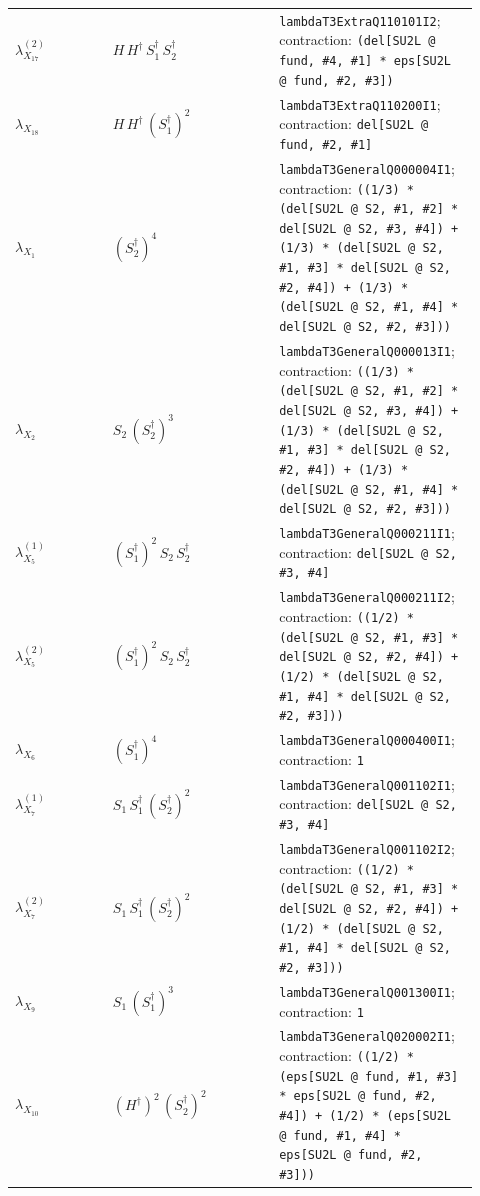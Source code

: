 \documentclass[9pt]{article}
\begin{document}
\begin{longtable}{@{}p{0.20\linewidth}p{0.34\linewidth}p{0.38\linewidth}@{}}
$\lambda_{X_{17}}^{(2)}$ & $H\,H^\dagger\,S_1^\dagger\,S_2^\dagger$ & \texttt{lambdaT3ExtraQ110101I2}; contraction: \texttt{(del[SU2L @ fund, \#4, \#1] * eps[SU2L @ fund, \#2, \#3])} \\
$\lambda_{X_{18}}$ & $H\,H^\dagger\,(S_1^\dagger)^{2}$ & \texttt{lambdaT3ExtraQ110200I1}; contraction: \texttt{del[SU2L @ fund, \#2, \#1]} \\
$\lambda_{X_{1}}$ & $(S_2^\dagger)^{4}$ & \texttt{lambdaT3GeneralQ000004I1}; contraction: \texttt{((1/3) * (del[SU2L @ S2, \#1, \#2] * del[SU2L @ S2, \#3, \#4]) + (1/3) * (del[SU2L @ S2, \#1, \#3] * del[SU2L @ S2, \#2, \#4]) + (1/3) * (del[SU2L @ S2, \#1, \#4] * del[SU2L @ S2, \#2, \#3]))} \\
$\lambda_{X_{2}}$ & $S_2\,(S_2^\dagger)^{3}$ & \texttt{lambdaT3GeneralQ000013I1}; contraction: \texttt{((1/3) * (del[SU2L @ S2, \#1, \#2] * del[SU2L @ S2, \#3, \#4]) + (1/3) * (del[SU2L @ S2, \#1, \#3] * del[SU2L @ S2, \#2, \#4]) + (1/3) * (del[SU2L @ S2, \#1, \#4] * del[SU2L @ S2, \#2, \#3]))} \\
$\lambda_{X_{5}}^{(1)}$ & $(S_1^\dagger)^{2}\,S_2\,S_2^\dagger$ & \texttt{lambdaT3GeneralQ000211I1}; contraction: \texttt{del[SU2L @ S2, \#3, \#4]} \\
$\lambda_{X_{5}}^{(2)}$ & $(S_1^\dagger)^{2}\,S_2\,S_2^\dagger$ & \texttt{lambdaT3GeneralQ000211I2}; contraction: \texttt{((1/2) * (del[SU2L @ S2, \#1, \#3] * del[SU2L @ S2, \#2, \#4]) + (1/2) * (del[SU2L @ S2, \#1, \#4] * del[SU2L @ S2, \#2, \#3]))} \\
$\lambda_{X_{6}}$ & $(S_1^\dagger)^{4}$ & \texttt{lambdaT3GeneralQ000400I1}; contraction: \texttt{1} \\
$\lambda_{X_{7}}^{(1)}$ & $S_1\,S_1^\dagger\,(S_2^\dagger)^{2}$ & \texttt{lambdaT3GeneralQ001102I1}; contraction: \texttt{del[SU2L @ S2, \#3, \#4]} \\
$\lambda_{X_{7}}^{(2)}$ & $S_1\,S_1^\dagger\,(S_2^\dagger)^{2}$ & \texttt{lambdaT3GeneralQ001102I2}; contraction: \texttt{((1/2) * (del[SU2L @ S2, \#1, \#3] * del[SU2L @ S2, \#2, \#4]) + (1/2) * (del[SU2L @ S2, \#1, \#4] * del[SU2L @ S2, \#2, \#3]))} \\
$\lambda_{X_{9}}$ & $S_1\,(S_1^\dagger)^{3}$ & \texttt{lambdaT3GeneralQ001300I1}; contraction: \texttt{1} \\
$\lambda_{X_{10}}$ & $(H^\dagger)^{2}\,(S_2^\dagger)^{2}$ & \texttt{lambdaT3GeneralQ020002I1}; contraction: \texttt{((1/2) * (eps[SU2L @ fund, \#1, \#3] * eps[SU2L @ fund, \#2, \#4]) + (1/2) * (eps[SU2L @ fund, \#1, \#4] * eps[SU2L @ fund, \#2, \#3]))} \\

\end{longtable}
\end{document}

